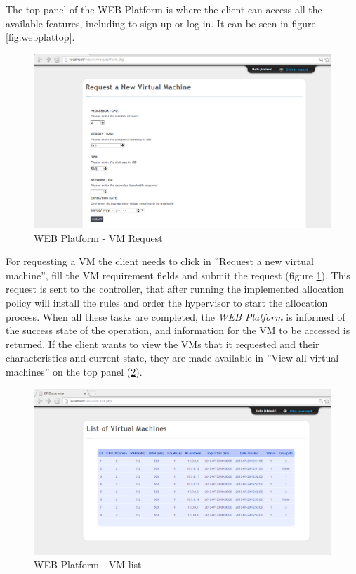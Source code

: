 \documentclass[12pt,english,oneside]{book}
\begin{document}
The top panel of the WEB Platform is where the client can access all the available features, including to sign up or log in.
It can be seen in figure \ref{fig:webplattop}.

\begin{figure}[h!tbp]
        \centering
        \includegraphics[width=1\textwidth]{figures/webplat_vmreq.png}
        \caption{WEB Platform - VM Request}
        \label{fig:webplatemreq}
\end{figure}

For requesting a VM the client needs to click in ''Request a new virtual machine'', fill the VM requirement fields and submit the request (figure \ref{fig:webplatemreq}). This request is sent to the controller, that after running the implemented allocation policy will install the rules and order the hypervisor to start the allocation process. When all these tasks are completed, the \textit{WEB Platform} is informed of the success state of the operation, and information for the VM to be accessed is returned.
If the client wants to view the VMs that it requested and their characteristics and current state, they are made available in ''View all virtual machines'' on the top panel (\ref{fig:webplatvmlist}).

\begin{figure}[h!tbp]
        \centering
        \includegraphics[width=1\textwidth]{figures/webplat_vmlist.png}
        \caption{WEB Platform - VM list}
        \label{fig:webplatvmlist}
\end{figure}
\end{document}
